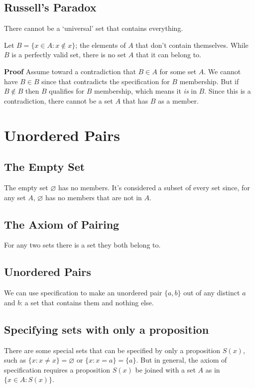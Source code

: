 \documentclass{article}
\begin{document}
\subsection{Russell's Paradox} There cannot be a `universal' set that contains everything. 

Let $B = \{x \in A: x \not\in x\}$; the elements of $A$ that don't contain themselves. While $B$ is a perfectly valid set, there is no set $A$ that it can belong to.

\textbf{Proof} Assume toward a contradiction that $B \in A$ for some set $A$. We cannot have $B \in B$ since that contradicts the specification for $B$ membership. But if $B \not\in B$ then $B$ qualifies for $B$ membership, which means it \textit{is} in $B$. Since this is a contradiction, there cannot be a set $A$ that has $B$ as a member.

\section{Unordered Pairs}

\subsection{The Empty Set} The empty set $\varnothing$ has no members. It's considered a subset of every set since, for any set $A$, $\varnothing$ has no members that are not in $A$.

\subsection{The Axiom of Pairing} For any two sets there is a set they both belong to. 

\subsection{Unordered Pairs} We can use specification to make an unordered pair $\{a, b\}$ out of any distinct $a$ and $b$: a set that contains them and nothing else. 

\subsection{Specifying sets with only a proposition} There are some special sets that can be specified by only a proposition $S(x)$, such as $\{x: x \neq x\} = \varnothing$ or $\{x: x = a\} = \{a\}$. But in general, the axiom of specification requires a proposition $S(x)$ be joined with a set $A$ as in $\{x \in A: S(x)\}$.
\end{document}
